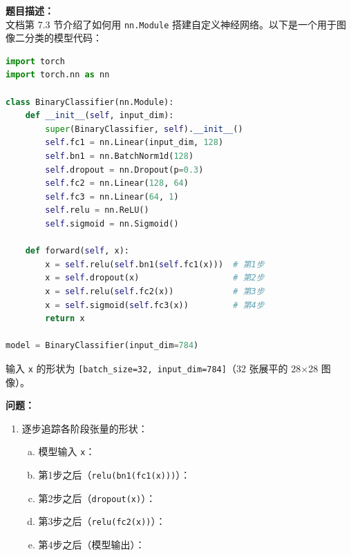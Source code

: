 \documentclass[a4paper,11pt]{ctexart}
\begin{document}
\begin{problembox}
    \textbf{题目描述：}\\
    文档第 7.3 节介绍了如何用 \texttt{nn.Module} 搭建自定义神经网络。以下是一个用于图像二分类的模型代码：

    \begin{lstlisting}[language=Python]
import torch
import torch.nn as nn

class BinaryClassifier(nn.Module):
    def __init__(self, input_dim):
        super(BinaryClassifier, self).__init__()
        self.fc1 = nn.Linear(input_dim, 128)
        self.bn1 = nn.BatchNorm1d(128)
        self.dropout = nn.Dropout(p=0.3)
        self.fc2 = nn.Linear(128, 64)
        self.fc3 = nn.Linear(64, 1)
        self.relu = nn.ReLU()
        self.sigmoid = nn.Sigmoid()

    def forward(self, x):
        x = self.relu(self.bn1(self.fc1(x)))  # 第1步
        x = self.dropout(x)                   # 第2步
        x = self.relu(self.fc2(x))            # 第3步
        x = self.sigmoid(self.fc3(x))         # 第4步
        return x

model = BinaryClassifier(input_dim=784)
    \end{lstlisting}

    输入 \texttt{x} 的形状为 \texttt{[batch\_size=32, input\_dim=784]}（32 张展平的 28$\times$28 图像）。

    \vspace{0.2cm}
    \textbf{问题：}
    \begin{enumerate}[(1)]
        \item 逐步追踪各阶段张量的形状：
        \begin{enumerate}[a.]
            \item 模型输入 \texttt{x}：\underline{\hspace{4cm}}
            \item 第1步之后（\texttt{relu(bn1(fc1(x)))}）：\underline{\hspace{4cm}}
            \item 第2步之后（\texttt{dropout(x)}）：\underline{\hspace{4cm}}
            \item 第3步之后（\texttt{relu(fc2(x))}）：\underline{\hspace{4cm}}
            \item 第4步之后（模型输出）：\underline{\hspace{4cm}}
        \end{enumerate}


\end{enumerate}
\end{problembox}
\end{document}

